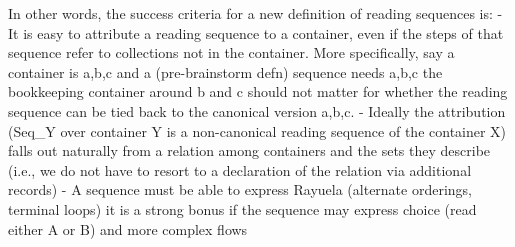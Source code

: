 In other words, the success criteria for a new definition of reading sequences is: 
- It is easy to attribute a reading sequence to a container, even if the steps of that sequence refer to collections not in the container. More specifically, say a container is {{a},{b},{c}} and a
  (pre-brainstorm defn) sequence needs {{a},{{b},{c}}} the bookkeeping container around {b} and {c} should not matter for whether the reading sequence can be tied back to the canonical version {{a},{b},{c}}.
- Ideally the attribution (Seq_Y over container Y is a non-canonical reading sequence of the container X) falls out naturally from a relation among containers and the sets they describe (i.e., we do not have to resort to a declaration of the relation via additional records)
- A sequence must be able to express Rayuela (alternate orderings, terminal loops) it is a strong bonus if the sequence may express choice (read either A or B) and more complex flows